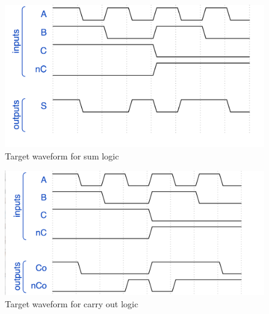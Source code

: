 \documentclass{article}
\begin{document}
\begin{figure}[H]
  \includegraphics[width=\linewidth]{opt_screenshots/test_logic_ideal_sum_out.png}
  \caption{Target waveform for sum logic}
  \label{fig:test_logic_ideal_sum_out}
\end{figure}

\begin{figure}[H]
  \includegraphics[width=\linewidth]{opt_screenshots/test_logic_ideal_carry_out.png}
  \caption{Target waveform for carry out logic}
  \label{fig:test_logic_ideal_carry_out}
\end{figure}
\end{document}
